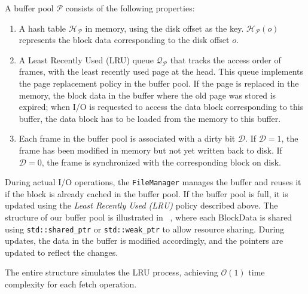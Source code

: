 A buffer pool $\mathcal{P}$ consists of the following properties:

\begin{enumerate}
    \item A hash table $\mathcal{H}_\mathcal{P}$ in memory, using the disk offset as the key. $\mathcal{H}_\mathcal{P}(o)$ represents the block data corresponding to the disk offset $o$.

    \item A Least Recently Used (LRU) queue $\mathcal{Q}_\mathcal{P}$ that tracks the access order of frames, with the least recently used page at the head. This queue implements the page replacement policy in the buffer pool. If the page is replaced in the memory, the block data in the buffer where the old page was stored is expired; when I/O is requested to access the data block corresponding to this buffer, the data block has to be loaded from the memory to this buffer.

    \item Each frame in the buffer pool is associated with a dirty bit $\mathcal{D}$. If $\mathcal{D} = 1$, the frame has been modified in memory but not yet written back to disk. If $\mathcal{D} = 0$, the frame is synchronized with the corresponding block on disk.
\end{enumerate}

During actual I/O operations, the \texttt{FileManager} manages the buffer and reuses it if the block is already cached in the buffer pool. If the buffer pool is full, it is updated using the \textit{Least Recently Used (LRU)} policy described above. The structure of our buffer pool is illustrated in ~, where each BlockData is shared using \texttt{std::shared\_ptr} or \texttt{std::weak\_ptr} to allow resource sharing. During updates, the data in the buffer is modified accordingly, and the pointers are updated to reflect the changes.

The entire structure simulates the LRU process, achieving $\mathcal{O}(1)$ time complexity for each fetch operation.
